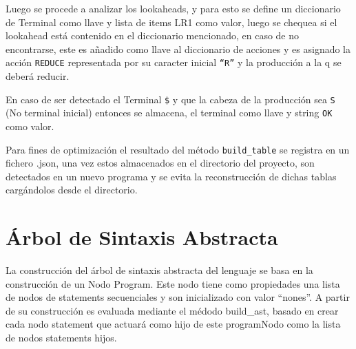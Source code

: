 \documentclass[10pt,a4paper]{article}
\begin{document}
		Luego se procede a analizar los lookaheads, y para esto se define un diccionario de Terminal como llave y lista de items LR1 como valor, luego se chequea si el lookahead est\'a contenido en el diccionario mencionado, en caso de no encontrarse, este es a\~nadido como llave al diccionario de acciones y es asignado la acci\'on \texttt{REDUCE} representada por su caracter inicial \texttt{``R''}  y la producci\'on a la q se deber\'a reducir.
		
		En caso de ser detectado el Terminal \texttt{\$} y que la cabeza de la producci\'on sea \texttt{S} (No terminal inicial) entonces se almacena, el terminal como llave y string \texttt{OK} como valor.
				
		Para fines de optimizaci\'on el resultado del m\'etodo \texttt{build\_table} se registra en un fichero .json, una vez estos almacenados en el directorio del proyecto, son detectados en un nuevo programa y se evita la reconstrucción de dichas tablas carg\'andolos desde el directorio.

\section{Árbol de Sintaxis Abstracta}
La construcción del árbol de sintaxis abstracta del lenguaje se basa en la construcción de un Nodo Program. Este nodo tiene como propiedades una lista de nodos de statements secuenciales y son inicializado con valor “nones”. A partir de su construcción es evaluada mediante el médodo build_ast, basado en crear cada nodo statement que actuará como hijo de este programNodo como la lista de nodos statements hijos.
\end{document}
